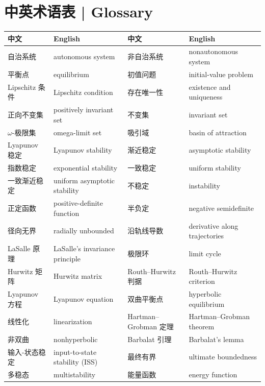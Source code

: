 \documentclass[UTF8,11pt,a4paper]{ctexart}
\begin{document}
\section*{中英术语表 | Glossary}
\begingroup\small
\setlength{\tabcolsep}{4pt}
\renewcommand{\arraystretch}{1.06}
\begin{tabular}{p{3.2cm}p{4.1cm}p{3.2cm}p{4.1cm}}
\hline
\textbf{中文} & \textbf{English} & \textbf{中文} & \textbf{English}\\
\hline
自治系统 & autonomous system & 非自治系统 & nonautonomous system\\
平衡点 & equilibrium & 初值问题 & initial-value problem\\
Lipschitz 条件 & Lipschitz condition & 存在唯一性 & existence and uniqueness\\
正向不变集 & positively invariant set & 不变集 & invariant set\\
$\omega$-极限集 & omega-limit set & 吸引域 & basin of attraction\\
Lyapunov 稳定 & Lyapunov stability & 渐近稳定 & asymptotic stability\\
指数稳定 & exponential stability & 一致稳定 & uniform stability\\
一致渐近稳定 & uniform asymptotic stability & 不稳定 & instability\\
正定函数 & positive-definite function & 半负定 & negative semidefinite\\
径向无界 & radially unbounded & 沿轨线导数 & derivative along trajectories\\
LaSalle 原理 & LaSalle's invariance principle & 极限环 & limit cycle\\
Hurwitz 矩阵 & Hurwitz matrix & Routh--Hurwitz 判据 & Routh--Hurwitz criterion\\
Lyapunov 方程 & Lyapunov equation & 双曲平衡点 & hyperbolic equilibrium\\
线性化 & linearization & Hartman--Grobman 定理 & Hartman--Grobman theorem\\
非双曲 & nonhyperbolic & Barbalat 引理 & Barbalat's lemma\\
输入-状态稳定 & input-to-state stability (ISS) & 最终有界 & ultimate boundedness\\
多稳态 & multistability & 能量函数 & energy function\\
\hline
\end{tabular}
\endgroup
\end{document}
